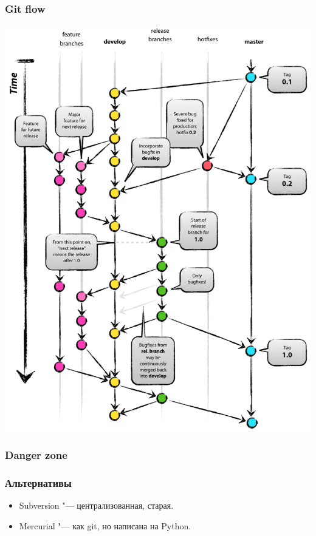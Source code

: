 \documentclass[pdf,russian,aspectratio=169]{beamer}
\begin{document}
\begin{frame}
    \frametitle{Git flow}
    \pause
    \center
    \includegraphics[height=0.8\textheight]{flow}
\end{frame}

\begin{frame}
    \frametitle{Danger zone}
\end{frame}

\begin{frame}
    \frametitle{Альтернативы}
    \begin{itemize}
        \item Subversion "--- централизованная, старая.
        \item Mercurial "--- как git, но написана на Python.
    \end{itemize}
\end{frame}
\end{document}
